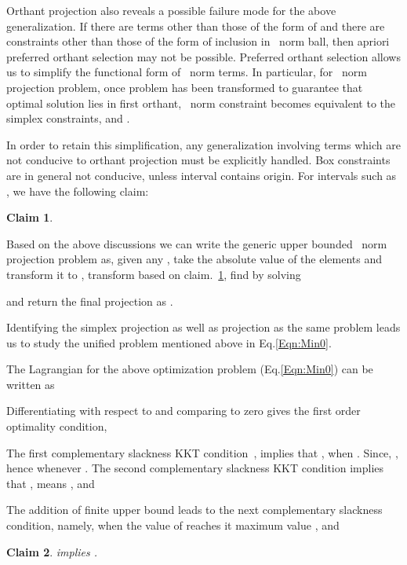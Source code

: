 \documentclass{article}
\newtheorem{claim}{Claim}
\def\Lo{~}
\def\Lp{~}
\begin{document}
Orthant projection also reveals a possible failure mode for the above generalization. If there are terms other than those of the form of  and there are constraints other than those of the form of inclusion in \Lp norm ball, then apriori preferred orthant selection may not be possible.
Preferred orthant selection allows us to simplify the functional form of \Lp norm terms.
In particular, for \Lo norm projection problem, once problem has been transformed to guarantee that optimal solution lies in first orthant, \Lo norm constraint becomes equivalent to the simplex constraints,  and .

In order to retain this simplification, any generalization involving terms which are not conducive to orthant projection must be explicitly handled. Box constraints are in general not conducive, unless interval contains origin.
For intervals such as , we have the following claim:
\begin{claim}\label{Claim:a_b_v}

\end{claim}



Based on the above discussions we can write the generic upper bounded \Lo norm projection problem as, given any , take the absolute value of the elements and transform it to , transform  based on claim.~\ref{Claim:a_b_v}, find  by solving

and return the final projection as .

Identifying the simplex projection as well as  projection as the same problem leads us to study the unified problem mentioned above in Eq.\eqref{Eqn:Min0}.


The Lagrangian for the above optimization problem (Eq.\eqref{Eqn:Min0}) can be written as

Differentiating with respect to  and comparing to zero gives the first order
optimality condition,

The first complementary slackness KKT condition~\cite{Boyd04}, implies that
, when . Since, , hence  whenever .
The second complementary slackness KKT condition implies that
, means ,  and

The addition of finite upper bound leads to the next complementary slackness condition, namely, when the value of  reaches it maximum value ,  and


\begin{claim}\label{Claim:x_b_v}
 implies .
\end{claim}
\end{document}
